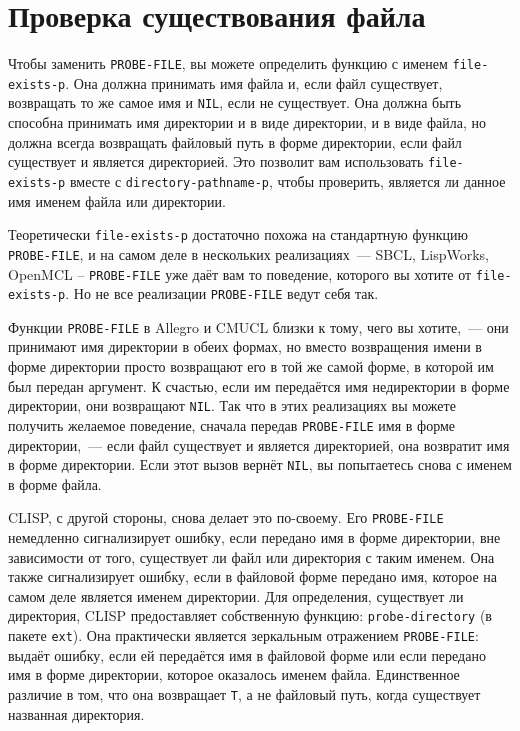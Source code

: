 \section{Проверка существования файла}

Чтобы заменить \lstinline{PROBE-FILE}, вы можете определить функцию с именем
\lstinline{file-exists-p}. Она должна принимать имя файла и, если файл существует, возвращать
то же самое имя и \lstinline{NIL}, если не существует. Она должна быть способна принимать имя
директории и в виде директории, и в виде файла, но должна всегда возвращать файловый путь
в форме директории, если файл существует и является директорией. Это позволит вам
использовать \lstinline{file-exists-p} вместе с \lstinline{directory-pathname-p}, чтобы проверить,
является ли данное имя именем файла или директории.

Теоретически \lstinline{file-exists-p} достаточно похожа на стандартную функцию
\lstinline{PROBE-FILE}, и на самом деле в нескольких реализациях~--- SBCL, LispWorks, OpenMCL
– \lstinline{PROBE-FILE} уже даёт вам то поведение, которого вы хотите от
\lstinline{file-exists-p}. Но не все реализации \lstinline{PROBE-FILE} ведут себя так.

Функции \lstinline{PROBE-FILE} в Allegro и CMUCL близки к тому, чего вы хотите,~--- они
принимают имя директории в обеих формах, но вместо возвращения имени в форме директории
просто возвращают его в той же самой форме, в которой им был передан аргумент. К счастью,
если им передаётся имя недиректории в форме директории, они возвращают \lstinline{NIL}. Так
что в этих реализациях вы можете получить желаемое поведение, сначала передав
\lstinline{PROBE-FILE} имя в форме директории,~--- если файл существует и является директорией,
она возвратит имя в форме директории. Если этот вызов вернёт \lstinline{NIL}, вы попытаетесь
снова с именем в форме файла.

CLISP, с другой стороны, снова делает это по-своему. Его \lstinline{PROBE-FILE} немедленно
сигнализирует ошибку, если передано имя в форме директории, вне зависимости от того,
существует ли файл или директория с таким именем. Она также сигнализирует ошибку, если в
файловой форме передано имя, которое на самом деле является именем директории. Для
определения, существует ли директория, CLISP предоставляет собственную функцию:
\lstinline{probe-directory} (в пакете \lstinline{ext}). Она практически является зеркальным
отражением \lstinline{PROBE-FILE}: выдаёт ошибку, если ей передаётся имя в файловой форме или
если передано имя в форме директории, которое оказалось именем файла. Единственное
различие в том, что она возвращает \lstinline{T}, а не файловый путь, когда существует
названная директория.

